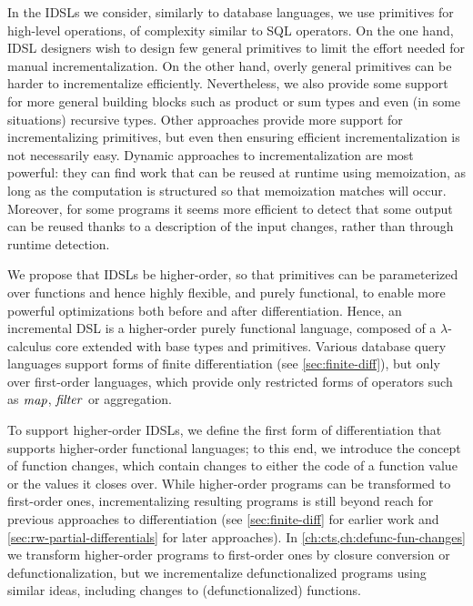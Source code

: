 In the IDSLs we consider, similarly to database languages, we use primitives for
high-level operations, of complexity similar to SQL operators.
On the one hand, IDSL designers wish to design few general primitives to limit
the effort needed for manual incrementalization.
On the other hand, overly general primitives can be harder to incrementalize
efficiently. Nevertheless, we also provide some support for more general
building blocks such as product or sum types and even (in some situations)
recursive types.
Other approaches provide more support for incrementalizing primitives, but even
then ensuring efficient incrementalization is not necessarily easy. Dynamic
approaches to incrementalization are most powerful: they can find work that can
be reused at runtime using memoization, as long as the computation is structured
so that memoization matches will occur. Moreover, for some programs it seems
more efficient to detect that some output can be reused thanks to a description
of the input changes, rather than through runtime detection.

We propose that IDSLs be higher-order, so that primitives can be parameterized
over functions and hence highly flexible, and purely functional, to enable more
powerful optimizations both before and after differentiation.
Hence, an incremental DSL is a higher-order purely functional language, composed
of a $\lambda$-calculus core extended with base types and primitives.
Various database query languages support forms of finite differentiation (see
\cref{sec:finite-diff}), but only over first-order languages, which provide only
restricted forms of operators such as \ensuremath{\Varid{map}}, \ensuremath{\Varid{filter}} or aggregation.

To support higher-order IDSLs, we define the first form of differentiation that
supports higher-order functional languages; to this end, we introduce the
concept of function changes, which contain changes to either the code
of a function value or the values it closes over. While higher-order programs can be
transformed to first-order ones, incrementalizing resulting programs is still
beyond reach for previous approaches to differentiation (see
\cref{sec:finite-diff} for earlier work and \cref{sec:rw-partial-differentials}
for later approaches).
In \cref{ch:cts,ch:defunc-fun-changes} we transform higher-order programs to first-order ones by
closure conversion or defunctionalization, but we incrementalize defunctionalized programs using
similar ideas, including changes to (defunctionalized) functions.

